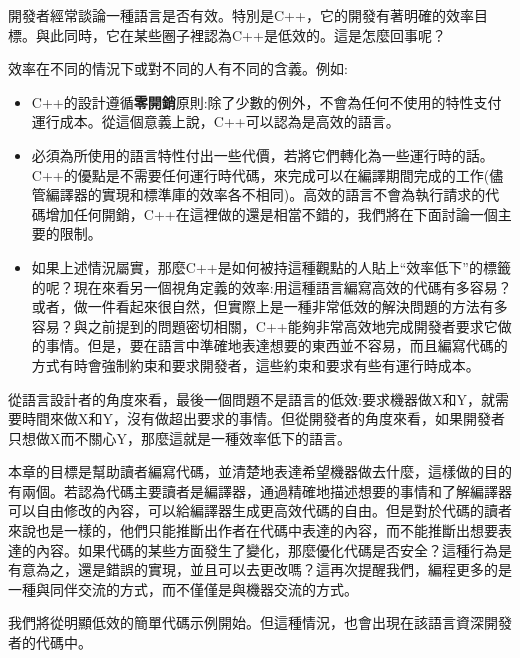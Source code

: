 開發者經常談論一種語言是否有效。特別是C++，它的開發有著明確的效率目標。與此同時，它在某些圈子裡認為C++是低效的。這是怎麼回事呢？

效率在不同的情況下或對不同的人有不同的含義。例如:

\begin{itemize}
\item
C++的設計遵循\textbf{零開銷}原則:除了少數的例外，不會為任何不使用的特性支付運行成本。從這個意義上說，C++可以認為是高效的語言。

\item
必須為所使用的語言特性付出一些代價，若將它們轉化為一些運行時的話。C++的優點是不需要任何運行時代碼，來完成可以在編譯期間完成的工作(儘管編譯器的實現和標準庫的效率各不相同)。高效的語言不會為執行請求的代碼增加任何開銷，C++在這裡做的還是相當不錯的，我們將在下面討論一個主要的限制。

\item
如果上述情況屬實，那麼C++是如何被持這種觀點的人貼上“效率低下”的標籤的呢？現在來看另一個視角定義的效率:用這種語言編寫高效的代碼有多容易？或者，做一件看起來很自然，但實際上是一種非常低效的解決問題的方法有多容易？與之前提到的問題密切相關，C++能夠非常高效地完成開發者要求它做的事情。但是，要在語言中準確地表達想要的東西並不容易，而且編寫代碼的方式有時會強制約束和要求開發者，這些約束和要求有些有運行時成本。
	
\end{itemize}

從語言設計者的角度來看，最後一個問題不是語言的低效:要求機器做X和Y，就需要時間來做X和Y，沒有做超出要求的事情。但從開發者的角度來看，如果開發者只想做X而不關心Y，那麼這就是一種效率低下的語言。 

本章的目標是幫助讀者編寫代碼，並清楚地表達希望機器做去什麼，這樣做的目的有兩個。若認為代碼主要讀者是編譯器，通過精確地描述想要的事情和了解編譯器可以自由修改的內容，可以給編譯器生成更高效代碼的自由。但是對於代碼的讀者來說也是一樣的，他們只能推斷出作者在代碼中表達的內容，而不能推斷出想要表達的內容。如果代碼的某些方面發生了變化，那麼優化代碼是否安全？這種行為是有意為之，還是錯誤的實現，並且可以去更改嗎？這再次提醒我們，編程更多的是一種與同伴交流的方式，而不僅僅是與機器交流的方式。

我們將從明顯低效的簡單代碼示例開始。但這種情況，也會出現在該語言資深開發者的代碼中。














